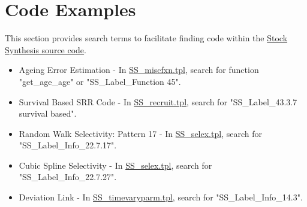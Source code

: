 \section{Code Examples}
\label{sec:codeappendix}
\hypertarget{CodeEx}{}

This section provides search terms to facilitate finding code within the \href{https://github.com/nmfs-stock-synthesis/stock-synthesis}{Stock Synthesis source code}. 

\begin{itemize}
  \item Ageing Error Estimation - In \href{https://github.com/nmfs-stock-synthesis/stock-synthesis/blob/main/SS_miscfxn.tpl}{SS\_miscfxn.tpl}, search for function "get\_age\_age" or "SS\_Label\_Function 45".
  \item Survival Based SRR Code - In \href{https://github.com/nmfs-stock-synthesis/stock-synthesis/blob/main/SS_recruit.tpl}{SS\_recruit.tpl}, search for "SS\_Label\_43.3.7  survival based".
  \item Random Walk Selectivity: Pattern 17 - In \href{https://github.com/nmfs-stock-synthesis/stock-synthesis/blob/main/SS_selex.tpl}{SS\_selex.tpl}, search for "SS\_Label\_Info\_22.7.17".
  \item Cubic Spline Selectivity - In \href{https://github.com/nmfs-stock-synthesis/stock-synthesis/blob/main/SS_selex.tpl}{SS\_selex.tpl}, search for "SS\_Label\_Info\_22.7.27".
  \item Deviation Link - In \href{https://github.com/nmfs-stock-synthesis/stock-synthesis/blob/main/SS_timevaryparm.tpl}{SS\_timevaryparm.tpl}, search for "SS\_Label\_Info\_14.3".\
\end{itemize}

\normalfont %
\normalsize %

\pagebreak